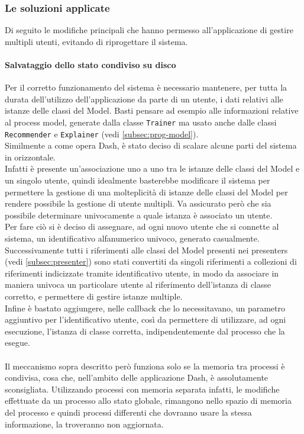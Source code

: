 \subsubsection{Le soluzioni applicate}
Di seguito le modifiche principali che hanno permesso all'applicazione di gestire multipli utenti, evitando di riprogettare il sistema.

\paragraph{Salvataggio dello stato condiviso su disco}
\label{subsubsec:salvataggio-diskdict}
Per il corretto funzionamento del sistema è necessario mantenere, per tutta la durata dell'utilizzo dell'applicazione da parte di un utente, i dati relativi alle istanze delle classi del Model.
Basti pensare ad esempio alle informazioni relative al process model, generate dalla classe \texttt{Trainer} ma usato anche dalle classi \texttt{Recommender} e \texttt{Explainer} (vedi \autoref{subsec:prog-model}).
\\
Similmente a come opera Dash, è stato deciso di scalare alcune parti del sistema in orizzontale.\\
Infatti è presente un'associazione uno a uno tra le istanze delle classi del Model e un singolo utente, quindi idealmente basterebbe modificare il sistema per permettere la gestione di una molteplicità di istanze delle classi del Model per rendere possibile la gestione di utente multipli. Va assicurato però che sia possibile determinare univocamente a quale istanza è associato un utente.
\\ 
Per fare ciò si è deciso di assegnare, ad ogni nuovo utente che si connette al sistema, un identificativo alfanumerico univoco, generato casualmente. Successivamente tutti i riferimenti alle classi del Model presenti nei presenters (vedi \autoref{subsec:presenter}) sono stati convertiti da singoli riferimenti a collezioni di riferimenti indicizzate tramite identificativo utente, in modo da associare in maniera univoca un particolare utente al riferimento dell'istanza di classe corretto, e permettere di gestire istanze multiple.
\\
Infine è bastato aggiungere, nelle callback che lo necessitavano, un parametro aggiuntivo per l'identificativo utente, così da permettere di utilizzare, ad ogni esecuzione, l'istanza di classe corretta, indipendentemente dal processo che la esegue.
\\ \\
Il meccanismo sopra descritto però funziona solo se la memoria tra processi è condivisa, cosa che, nell'ambito delle applicazione Dash, è assolutamente sconsigliata. Utilizzando processi con memoria separata infatti, le modifiche effettuate da un processo allo stato globale, rimangono nello spazio di memoria del processo e quindi processi differenti che dovranno usare la stessa informazione, la troveranno non aggiornata.
